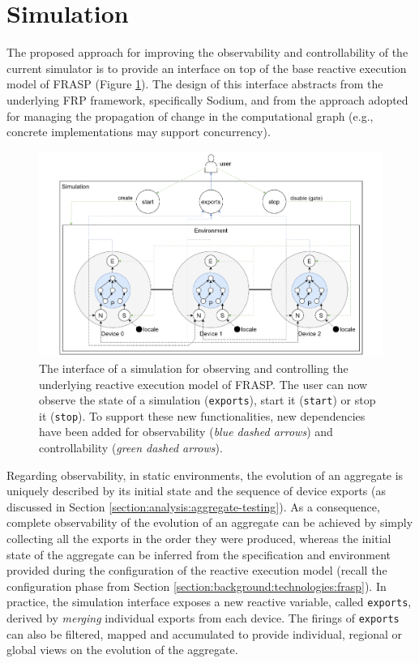 
\section{Simulation}
\label{section:design:simulation}

The proposed approach for improving the observability and controllability of
the current simulator is to provide an interface on top of the base reactive
execution model of FRASP (Figure \ref{figure:simulation}). The design of this
interface abstracts from the underlying \ac{FRP} framework, specifically
Sodium, and from the approach adopted for managing the propagation of change in
the computational graph (e.g., concrete implementations may support
concurrency).

\begin{figure}[!ht]
  \centering
  \includegraphics[width=1\textwidth]{resources/figures/simulation.pdf}
  \caption[The interface of a simulation]{
    The interface of a simulation for observing and controlling the underlying
    reactive execution model of FRASP. The user can now observe the state of a
    simulation (\texttt{exports}), start it (\texttt{start}) or stop it
    (\texttt{stop}). To support these new functionalities, new dependencies
    have been added for observability (\textit{blue dashed arrows}) and
    controllability (\textit{green dashed arrows}).
  }
  \label{figure:simulation}
\end{figure}

Regarding observability, in static environments, the evolution of an aggregate
is uniquely described by its initial state and the sequence of device exports
(as discussed in Section \ref{section:analysis:aggregate-testing}). As a
consequence, complete observability of the evolution of an aggregate can be
achieved by simply collecting all the exports in the order they were produced,
whereas the initial state of the aggregate can be inferred from the
specification and environment provided during the configuration of the reactive
execution model (recall the configuration phase from Section
\ref{section:background:technologies:frasp}). In practice, the simulation
interface exposes a new reactive variable, called \texttt{exports}, derived by
\textit{merging} individual exports from each device. The firings of
\texttt{exports} can also be filtered, mapped and accumulated to provide
individual, regional or global views on the evolution of the aggregate.

